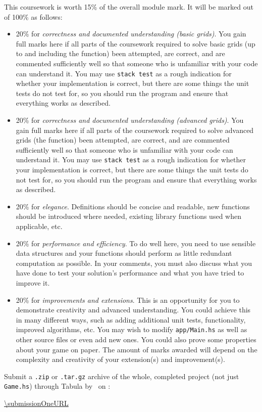 This coursework is worth 15\% of the overall module mark. It will be marked out of 100\% as follows:
\begin{itemize}
	\item 20\% for \emph{correctness and documented understanding (basic grids)}. You gain full marks here if all parts of the coursework required to solve basic grids (up to and including the  function) been attempted, are correct, and are commented sufficiently well so that someone who is unfamiliar with your code can understand it. You may use \texttt{\small stack test} as a rough indication for whether your implementation is correct, but there are some things the unit tests do not test for, so you should run the program and ensure that everything works as described.
	
	\item 20\% for \emph{correctness and documented understanding (advanced grids)}. You gain full marks here if all parts of the coursework required to solve advanced grids (the  function) been attempted, are correct, and are commented sufficiently well so that someone who is unfamiliar with your code can understand it. You may use \texttt{\small stack test} as a rough indication for whether your implementation is correct, but there are some things the unit tests do not test for, so you should run the program and ensure that everything works as described.
	
	\item 20\% for \emph{elegance}. Definitions should be concise and readable, new functions should be introduced where needed, existing library functions used when applicable, etc.
	 
	\item 20\% for \emph{performance and efficiency}. To do well here, you need to use sensible data structures and your functions should perform as little redundant computation as possible. In your comments, you must also discuss what you have done to test your solution's performance and what you have tried to improve it. %
	
	\item 20\% for \emph{improvements and extensions}. This is an opportunity for you to demonstrate creativity and advanced understanding. You could achieve this in many different ways, such as adding additional unit tests, functionality, improved algorithms, etc. You may wish to modify \texttt{\small app/Main.hs} as well as other source files or even add new ones. You could also prove some properties about your game on paper. The amount of marks awarded will depend on the complexity and creativity of your extension(s) and improvement(s).
\end{itemize}
Submit a \texttt{\small .zip} or \texttt{\small .tar.gz} archive of the whole, completed project (not just \texttt{\small Game.hs}) through Tabula by \deadlineOneTime\ on \deadlineOneDate:
\begin{center} 
	\url{\submissionOneURL}
\end{center}
